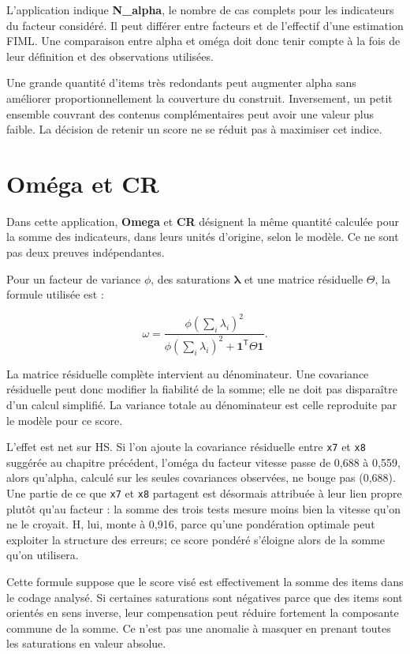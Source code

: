 \documentclass[
  french,
  11pt,
  a4paper,
  DIV=11,
  numbers=noendperiod]{scrreprt}
\begin{document}
L'application indique \textbf{N\_alpha}, le nombre de cas complets pour
les indicateurs du facteur considéré. Il peut différer entre facteurs et
de l'effectif d'une estimation FIML. Une comparaison entre alpha et
oméga doit donc tenir compte à la fois de leur définition et des
observations utilisées.

Une grande quantité d'items très redondants peut augmenter alpha sans
améliorer proportionnellement la couverture du construit. Inversement,
un petit ensemble couvrant des contenus complémentaires peut avoir une
valeur plus faible. La décision de retenir un score ne se réduit pas à
maximiser cet indice.

\section{Oméga et CR}\label{omuxe9ga-et-cr}

Dans cette application, \textbf{Omega} et \textbf{CR} désignent la même
quantité calculée pour la somme des indicateurs, dans leurs unités
d'origine, selon le modèle. Ce ne sont pas deux preuves indépendantes.

Pour un facteur de variance \(\phi\), des saturations
\(\boldsymbol{\lambda}\) et une matrice résiduelle \(\Theta\), la
formule utilisée est :

\[\omega=\frac{\phi(\sum_i\lambda_i)^2}{\phi(\sum_i\lambda_i)^2+\boldsymbol{1}^{\mathsf T}\Theta\boldsymbol{1}}.\]

La matrice résiduelle complète intervient au dénominateur. Une
covariance résiduelle peut donc modifier la fiabilité de la somme; elle
ne doit pas disparaître d'un calcul simplifié. La variance totale au
dénominateur est celle reproduite par le modèle pour ce score.

L'effet est net sur HS. Si l'on ajoute la covariance résiduelle entre
\texttt{x7} et \texttt{x8} suggérée au chapitre précédent, l'oméga du
facteur vitesse passe de 0,688 à 0,559, alors qu'alpha, calculé sur les
seules covariances observées, ne bouge pas (0,688). Une partie de ce que
\texttt{x7} et \texttt{x8} partagent est désormais attribuée à leur lien
propre plutôt qu'au facteur : la somme des trois tests mesure moins bien
la vitesse qu'on ne le croyait. H, lui, monte à 0,916, parce qu'une
pondération optimale peut exploiter la structure des erreurs; ce score
pondéré s'éloigne alors de la somme qu'on utilisera.

Cette formule suppose que le score visé est effectivement la somme des
items dans le codage analysé. Si certaines saturations sont négatives
parce que des items sont orientés en sens inverse, leur compensation
peut réduire fortement la composante commune de la somme. Ce n'est pas
une anomalie à masquer en prenant toutes les saturations en valeur
absolue.
\end{document}
